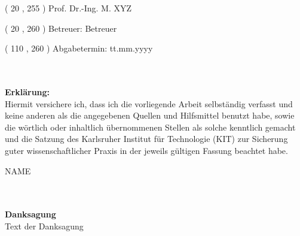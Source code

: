 \begin{textblock}{80}( 20 , 255 )
\large
\noindent
Prof. Dr.-Ing. M. XYZ															%
\end{textblock}

\begin{textblock}{80}( 20 , 260 )
\large
\flushleft
\noindent
Betreuer: Betreuer                              									%
\end{textblock}

\begin{textblock}{80}( 110 , 260 )
\flushright
\large
Abgabetermin: tt.mm.yyyy                        									%
\end{textblock}

\null\newpage

\thispagestyle{empty}
\newpage

\cleardoublepage
\thispagestyle{empty}
\hspace{2cm}\\
\vspace{16cm}\\
\textbf{Erklärung:}\\
Hiermit versichere ich, dass ich die vorliegende Arbeit selbständig verfasst und keine anderen als die angegebenen Quellen und Hilfsmittel benutzt habe, sowie die wörtlich oder inhaltlich übernommenen Stellen als solche kenntlich gemacht und die Satzung des Karlsruher Institut für Technologie (KIT) zur Sicherung guter wissenschaftlicher Praxis in der jeweils gültigen Fassung beachtet habe.
\vspace*{\fill}

NAME   %


\null\newpage
\thispagestyle{empty}
\newpage
\cleardoublepage
\thispagestyle{empty}
\hspace{2cm}\\
\vspace{18cm}\\
\textbf{Danksagung}\\
Text der Danksagung\\
\null\newpage
\thispagestyle{empty}
\newpage
\cleardoublepage

